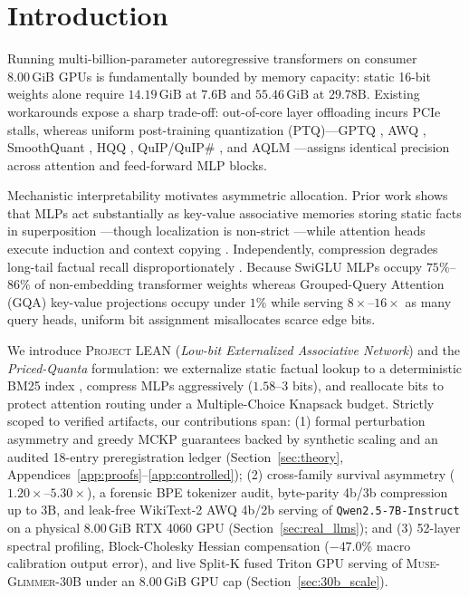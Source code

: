 \documentclass[10pt]{article} %
\newcommand{\lean}{\textsc{Project LEAN}}
\newcommand{\glimmer}{\textsc{Muse-Glimmer-30B}}
\begin{document}
\section{Introduction}
\label{sec:intro}

Running multi-billion-parameter autoregressive transformers \citep{vaswani2017attention} on consumer $8.00\,\text{GiB}$ GPUs is fundamentally bounded by memory capacity: static 16-bit weights alone require $14.19\,\text{GiB}$ at $7.6\text{B}$ and $55.46\,\text{GiB}$ at $29.78\text{B}$. Existing workarounds expose a sharp trade-off: out-of-core layer offloading \citep{sheng2023flexgen} incurs PCIe stalls, whereas uniform post-training quantization (PTQ)---GPTQ \citep{frantar2023gptq}, AWQ \citep{lin2024awq}, SmoothQuant \citep{xiao2023smoothquant}, HQQ \citep{badri2023hqq}, QuIP/QuIP\# \citep{chee2023quip,tseng2024quipsharp}, and AQLM \citep{egiazarian2024aqlm}---assigns identical precision across attention and feed-forward MLP blocks.

Mechanistic interpretability motivates asymmetric allocation. Prior work shows that MLPs act substantially as key-value associative memories \citep{geva2021transformer,meng2022locating} storing static facts in superposition \citep{elhage2022superposition}---though localization is non-strict \citep{hase2023localization}---while attention heads execute induction and context copying \citep{olsson2022incontext,ainslie2023gqa}. Independently, compression degrades long-tail factual recall disproportionately \citep{kandpal2023large,jaiswal2024compressing}. Because SwiGLU MLPs occupy $75\%$--$86\%$ of non-embedding transformer weights whereas Grouped-Query Attention (GQA) key-value projections occupy under $1\%$ while serving $8\times$--$16\times$ as many query heads, uniform bit assignment misallocates scarce edge bits.

We introduce \lean{} (\emph{Low-bit Externalized Associative Network}) and the \emph{Priced-Quanta} formulation: we externalize static factual lookup to a deterministic BM25 index \citep{robertson2009bm25}, compress MLPs aggressively ($1.58$--$3$ bits), and reallocate bits to protect attention routing under a Multiple-Choice Knapsack budget. Strictly scoped to verified artifacts, our contributions span: (1) formal perturbation asymmetry and greedy MCKP guarantees backed by synthetic scaling and an audited 18-entry preregistration ledger (Section~\ref{sec:theory}, Appendices~\ref{app:proofs}--\ref{app:controlled}); (2) cross-family survival asymmetry ($1.20\times$--$5.30\times$), a forensic BPE tokenizer audit, byte-parity 4b/3b compression up to $3\text{B}$, and leak-free WikiText-2 AWQ 4b/2b serving of \texttt{Qwen2.5-7B-Instruct} on a physical $8.00\,\text{GiB}$ RTX 4060 GPU (Section~\ref{sec:real_llms}); and (3) 52-layer spectral profiling, Block-Cholesky Hessian compensation ($-47.0\%$ macro calibration output error), and live Split-K fused Triton GPU serving of \glimmer{} under an $8.00\,\text{GiB}$ GPU cap (Section~\ref{sec:30b_scale}).
\end{document}
